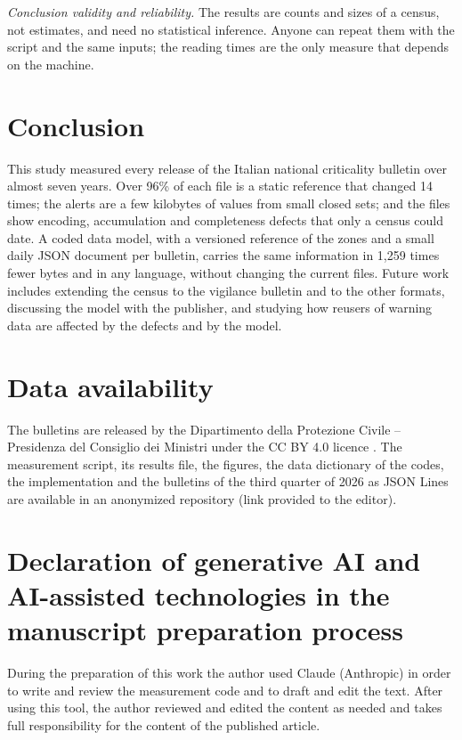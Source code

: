 \documentclass[review,authoryear,12pt]{elsarticle}
\newcommand{\repository}{an anonymized repository (link provided to the editor)}
\newcommand{\repository}{\url{https://github.com/webysther/aiodpc}}
\begin{document}
\emph{Conclusion validity and reliability.} The results are counts and sizes
of a census, not estimates, and need no statistical inference. Anyone can
repeat them with the script and the same inputs; the reading times are the only
measure that depends on the machine.

\section{Conclusion}
\label{sec:conclusion}

This study measured every release of the Italian national criticality
bulletin over almost seven years. Over 96\% of each file is a static reference
that changed 14 times; the alerts are a few kilobytes of values from small
closed sets; and the files show encoding, accumulation and completeness defects
that only a census could date. A coded data model, with a versioned reference
of the zones and a small daily JSON document per bulletin, carries the same
information in 1,259 times fewer bytes and in any language, without changing the current
files. Future work includes extending the census to the vigilance bulletin and
to the other formats, discussing the model with the publisher, and studying
how reusers of warning data are affected by the defects and by the model.

\section*{Data availability}

The bulletins are released by the Dipartimento della Protezione Civile --
Presidenza del Consiglio dei Ministri under the CC BY 4.0 licence
\citep{dpc2026criticality,dpc2026vigilance}. The measurement script, its
results file, the figures, the data dictionary of the codes, the
implementation and the bulletins of the third quarter of 2026 as JSON Lines
are available in \repository{}.

\section*{Declaration of generative AI and AI-assisted technologies in the
manuscript preparation process}

During the preparation of this work the author used Claude (Anthropic) in
order to write and review the measurement code and to draft and edit the text.
After using this tool, the author reviewed and edited the content as needed
and takes full responsibility for the content of the published article.



\end{document}
